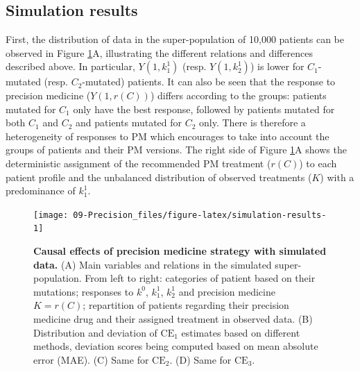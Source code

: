 \documentclass[a4paper,12pt,twoside,onecolumn,openright,final,oldfontcommands]{memoir}
\begin{document}
\subsection{Simulation results}\label{simulation-results}

First, the distribution of data in the super-population of 10,000
patients can be observed in Figure \ref{fig:simulation-results}A,
illustrating the different relations and differences described above. In
particular, \(Y(1, k^1_1)\) (resp. \(Y(1, k^1_2)\)) is lower for
\(C_1\)-mutated (resp. \(C_2\)-mutated) patients. It can also be seen
that the response to precision medicine (\(Y(1, r(C))\)) differs
according to the groups: patients mutated for \(C_1\) only have the best
response, followed by patients mutated for both \(C_1\) and \(C_2\) and
patients mutated for \(C_2\) only. There is therefore a heterogeneity of
responses to PM which encourages to take into account the groups of
patients and their PM versions. The right side of Figure
\ref{fig:simulation-results}A shows the deterministic assignment of the
recommended PM treatment (\(r(C)\)) to each patient profile and the
unbalanced distribution of observed treatments (\(K\)) with a
predominance of \(k^1_1\).

\begin{figure}

{\centering \texttt{[image: 09-Precision\_files/figure-latex/simulation-results-1]} 

}

\caption[Causal effects of precision medicine strategy with simulated data]{\textbf{Causal effects of precision
medicine strategy with simulated data.} (A) Main variables and relations
in the simulated super-population. From left to right: categories of
patient based on their mutations; responses to \(k^0\), \(k^1_1\),
\(k^1_2\) and precision medicine \(K=r(C)\); repartition of patients
regarding their precision medicine drug and their assigned treatment in
observed data. (B) Distribution and deviation of \(\text{CE}_1\)
estimates based on different methods, deviation scores being computed
based on mean absolute error (MAE). (C) Same for \(\text{CE}_2\). (D)
Same for \(\text{CE}_3\).}\label{fig:simulation-results}
\end{figure}
\end{document}
